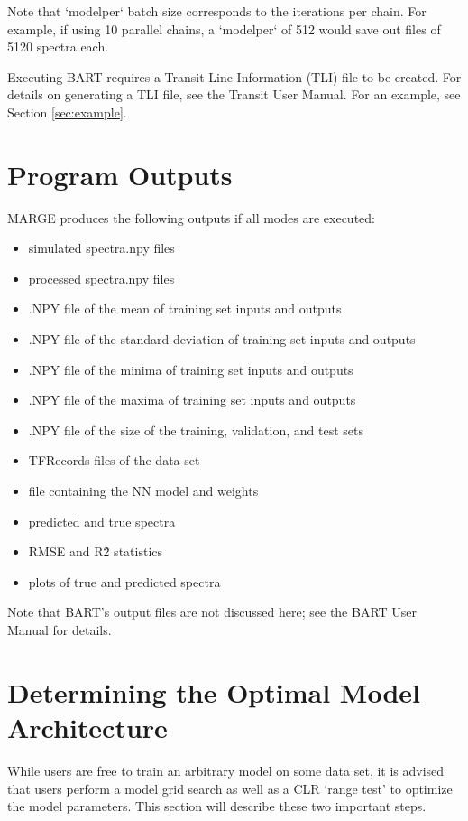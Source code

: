 \documentclass[letterpaper, 12pt]{article}
\begin{document}
\noindent Note that `modelper` batch size corresponds to the iterations per 
chain.  For example, if using 10 parallel chains, a `modelper` of 512 would 
save out files of 5120 spectra each.

\noindent  Executing BART requires a Transit Line-Information (TLI) file to 
be created.  For details on generating a TLI file, see the Transit User Manual.
For an example, see Section \ref{sec:example}.



\section{Program Outputs}
\label{sec:outputs}

MARGE produces the following outputs if all modes are executed:

\begin{itemize}
\item simulated spectra.npy files
\item processed spectra.npy files
\item .NPY file of the mean of training set inputs and outputs
\item .NPY file of the standard deviation of training set inputs and outputs
\item .NPY file of the minima of training set inputs and outputs
\item .NPY file of the maxima of training set inputs and outputs
\item .NPY file of the size of the training, validation, and test sets
\item TFRecords files of the data set
\item file containing the NN model and weights
\item predicted and true spectra
\item RMSE and R\^2 statistics
\item plots of true and predicted spectra
\end{itemize}

\noindent Note that BART's output files are not discussed here; see the BART 
User Manual for details.

\section{Determining the Optimal Model Architecture}

While users are free to train an arbitrary model on some data set, it is 
advised that users perform a model grid search as well as a CLR `range test' 
to optimize the model parameters.  This section will describe these two 
important steps.
\end{document}
